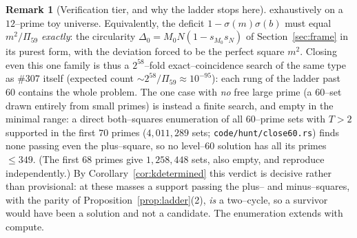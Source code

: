 \documentclass[11pt]{article}
\theoremstyle{definition}
\newtheorem{remark}[theorem]{Remark}
\begin{document}
\begin{remark}[Verification tier, and why the ladder stops here]
exhaustively on a $12$--prime toy universe. Equivalently, the deficit $1-\sigma(m)\sigma(b)$ must
equal $m^2/\Pi_{59}$ \emph{exactly}: the circularity $\Delta_0=M_0N(1-s_{M_0}s_N)$ of
Section~\ref{sec:frame} in its purest form, with the deviation forced to be the perfect square
$m^2$. Closing even this one family is thus a $2^{58}$--fold exact--coincidence search of the same
type as \#307 itself (expected count ${\sim}2^{58}/\Pi_{59}\approx10^{-95}$): each rung of the
ladder past $60$ contains the whole problem. The one case with \emph{no} free large prime (a
$60$--set drawn entirely from small primes) is instead a finite search, and empty in the
minimal range: a direct both--squares enumeration of all $60$--prime sets with $T>2$ supported in
the first $70$ primes ($4{,}011{,}289$ sets; \texttt{code/hunt/close60.rs}) finds none passing even the
plus--square, so no level--$60$ solution has all its primes $\le349$. (The first $68$ primes give
$1{,}258{,}448$ sets, also empty, and reproduce independently.) By
Corollary~\ref{cor:kdetermined} this verdict is decisive rather than provisional: at these masses a
support passing the plus-- and minus--squares, with the parity of Proposition~\ref{prop:ladder}(2),
\emph{is} a two--cycle, so a survivor would have been a solution and not a candidate. The
enumeration extends with compute.
\end{remark}
\end{document}
